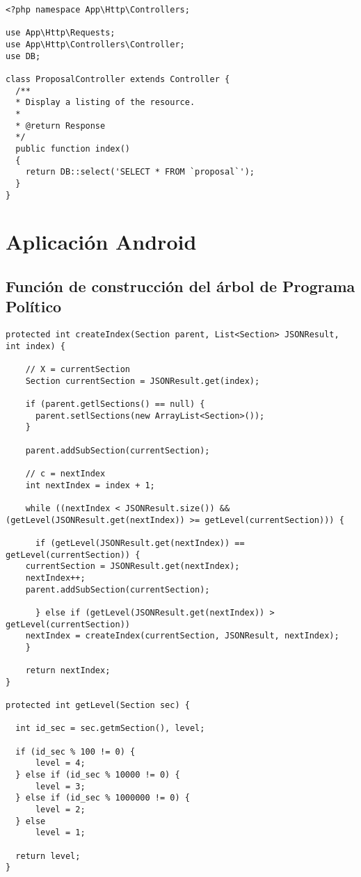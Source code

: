 \lstset{
  language        = php}
\begin{lstlisting}[frame=single]
<?php namespace App\Http\Controllers;

use App\Http\Requests;
use App\Http\Controllers\Controller;
use DB;

class ProposalController extends Controller {
  /**
  * Display a listing of the resource.
  *
  * @return Response
  */
  public function index()
  {
    return DB::select('SELECT * FROM `proposal`');
  }
}
\end{lstlisting}

\section{Aplicación Android}

\subsection{Función de construcción del árbol de Programa Político}\label{ssec:codeProgramTree}

	  \begin{lstlisting}[frame=single]	
protected int createIndex(Section parent, List<Section> JSONResult, int index) {

    // X = currentSection
    Section currentSection = JSONResult.get(index);

    if (parent.getlSections() == null) {
      parent.setlSections(new ArrayList<Section>());
    }
	    
    parent.addSubSection(currentSection);

    // c = nextIndex
    int nextIndex = index + 1;

    while ((nextIndex < JSONResult.size()) && (getLevel(JSONResult.get(nextIndex)) >= getLevel(currentSection))) {
      
      if (getLevel(JSONResult.get(nextIndex)) == getLevel(currentSection)) {
	currentSection = JSONResult.get(nextIndex);
	nextIndex++;
	parent.addSubSection(currentSection);
	
      } else if (getLevel(JSONResult.get(nextIndex)) > getLevel(currentSection))
	nextIndex = createIndex(currentSection, JSONResult, nextIndex);
    }
    
    return nextIndex;
}

protected int getLevel(Section sec) {
  
  int id_sec = sec.getmSection(), level;
  
  if (id_sec % 100 != 0) {
      level = 4;     
  } else if (id_sec % 10000 != 0) {
      level = 3;      
  } else if (id_sec % 1000000 != 0) {
      level = 2;    
  } else
      level = 1;
      
  return level;
}	   
	  \end{lstlisting}
	  
